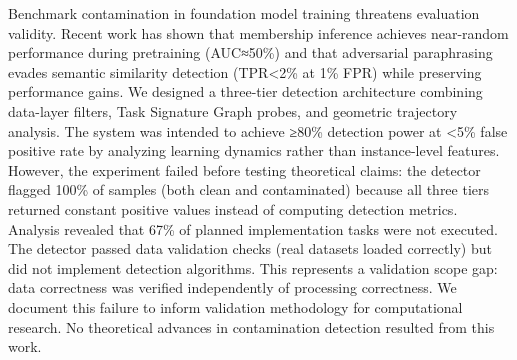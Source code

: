 
Benchmark contamination in foundation model training threatens evaluation validity. Recent work has shown that membership inference achieves near-random performance during pretraining (AUC≈50\%) and that adversarial paraphrasing evades semantic similarity detection (TPR<2\% at 1\% FPR) while preserving performance gains. We designed a three-tier detection architecture combining data-layer filters, Task Signature Graph probes, and geometric trajectory analysis. The system was intended to achieve ≥80\% detection power at <5\% false positive rate by analyzing learning dynamics rather than instance-level features. However, the experiment failed before testing theoretical claims: the detector flagged 100\% of samples (both clean and contaminated) because all three tiers returned constant positive values instead of computing detection metrics. Analysis revealed that 67\% of planned implementation tasks were not executed. The detector passed data validation checks (real datasets loaded correctly) but did not implement detection algorithms. This represents a validation scope gap: data correctness was verified independently of processing correctness. We document this failure to inform validation methodology for computational research. No theoretical advances in contamination detection resulted from this work.
